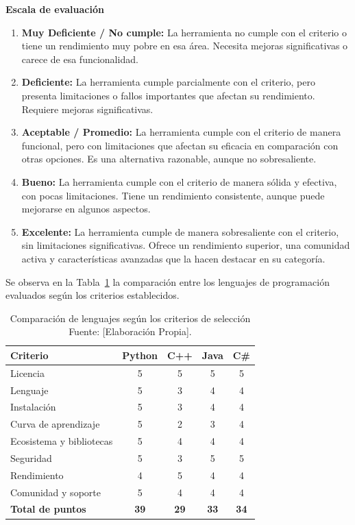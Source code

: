 \textbf{Escala de evaluación}

\begin{enumerate}
    \item \textbf{Muy Deficiente / No cumple:} La herramienta no cumple con el criterio o tiene un rendimiento muy pobre en esa área. Necesita mejoras significativas o carece de esa funcionalidad.
    
    \item \textbf{Deficiente:} La herramienta cumple parcialmente con el criterio, pero presenta limitaciones o fallos importantes que afectan su rendimiento. Requiere mejoras significativas.
    
    \item \textbf{Aceptable / Promedio:} La herramienta cumple con el criterio de manera funcional, pero con limitaciones que afectan su eficacia en comparación con otras opciones. Es una alternativa razonable, aunque no sobresaliente.
    
    \item \textbf{Bueno:} La herramienta cumple con el criterio de manera sólida y efectiva, con pocas limitaciones. Tiene un rendimiento consistente, aunque puede mejorarse en algunos aspectos.
    
    \item \textbf{Excelente:} La herramienta cumple de manera sobresaliente con el criterio, sin limitaciones significativas. Ofrece un rendimiento superior, una comunidad activa y características avanzadas que la hacen destacar en su categoría.
\end{enumerate}


Se observa en la Tabla~\ref{tab:comparacion_lenguajes} la comparación entre los lenguajes de programación evaluados según los criterios establecidos.

\begin{table}[H]
\centering
\caption{Comparación de lenguajes según los criterios de selección Fuente: [Elaboración Propia].}
\label{tab:comparacion_lenguajes}
\renewcommand{\arraystretch}{1.3}
\begin{tabular}{|p{6cm}|c|c|c|c|}
\hline
\textbf{Criterio} & \textbf{Python} & \textbf{C++} & \textbf{Java} & \textbf{C\#} \\ \hline
Licencia & 5 & 5 & 5 & 5 \\ \hline
Lenguaje & 5 & 3 & 4 & 4 \\ \hline
Instalación & 5 & 3 & 4 & 4 \\ \hline
Curva de aprendizaje & 5 & 2 & 3 & 4 \\ \hline
Ecosistema y bibliotecas & 5 & 4 & 4 & 4 \\ \hline
Seguridad & 5 & 3 & 5 & 5 \\ \hline
Rendimiento & 4 & 5 & 4 & 4 \\ \hline
Comunidad y soporte & 5 & 4 & 4 & 4 \\ \hline
\textbf{Total de puntos} & \textbf{39} & \textbf{29} & \textbf{33} & \textbf{34} \\ \hline
\end{tabular}
\end{table}


